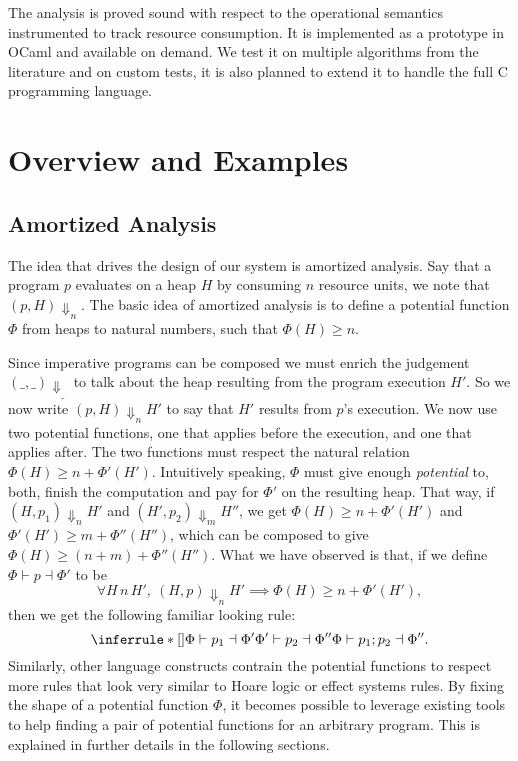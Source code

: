 \documentclass[10pt]{article}
\begin{document}
The analysis is proved sound with respect to
the operational semantics instrumented to track resource
consumption.  It is implemented as a prototype
in OCaml and available on demand.  We test it on multiple
algorithms from the literature and on custom tests, it
is also planned to extend it to handle the full C programming
language.

\section{Overview and Examples}

\subsection{Amortized Analysis}
The idea that drives the design of our system is amortized
analysis.  Say that a program $p$ evaluates on a heap $H$
by consuming $n$ resource units, we note that $(p, H) \Downarrow_n$.
The basic idea of amortized analysis is to define a potential function
$\Phi$ from heaps to natural numbers, such that $\Phi(H) \ge n$.

Since imperative programs can be composed we must enrich
the judgement $(\_, \_) \Downarrow_{\_}$ to talk about the heap
resulting from the program execution $H'$.  So we now write
$(p, H) \Downarrow_n H'$ to say that $H'$ results from $p$'s
execution.  We now use two potential functions, one
that applies before the execution, and one that applies
after.  The two functions must respect the natural relation
$\Phi(H) \ge n + \Phi'(H')$.  Intuitively speaking, $\Phi$ must
give enough \emph{potential} to, both, finish the computation
and pay for $\Phi'$ on the resulting heap. That way, if $(H, p_1) \Downarrow_n H'$
and $(H', p_2) \Downarrow_m H''$, we get $\Phi(H) \ge
n + \Phi'(H')$ and $\Phi'(H') \ge m + \Phi''(H'')$, which
can be composed to give $\Phi(H) \ge (n + m) + \Phi''(H'')$.
What we have observed is that, if we define $\Phi \vdash p \dashv \Phi'$
to be
$$
\forall H\,n\,H',~(H, p)\Downarrow_n H' \implies \Phi(H) \ge
n + \Phi'(H'),
$$
then we get the following familiar looking rule:
$$
\RuleNolabel
{\Phi \vdash p_1 \dashv \Phi' \\ \Phi' \vdash p_2 \dashv \Phi''}
{\Phi \vdash p_1; p_2 \dashv \Phi''}
.
$$
Similarly, other language constructs contrain the potential
functions to respect more rules that look very similar to
Hoare logic or effect systems rules.  By fixing the shape of
a potential function $\Phi$, it becomes possible to leverage
existing tools to help finding a pair of potential functions
for an arbitrary program.  This is explained in further details
in the following sections.
\end{document}

